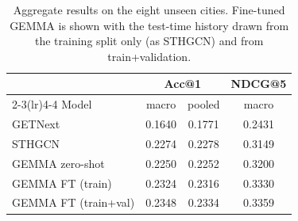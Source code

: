 \begin{table}[t]
\caption{Aggregate results on the eight unseen cities. Fine-tuned GEMMA is shown with the test-time
history drawn from the training split only (as STHGCN) and from train+validation.}
\label{tab:aggregate}
\small\setlength{\tabcolsep}{4pt}
\begin{tabular}{lccc}
\toprule
 & \multicolumn{2}{c}{Acc@1} & NDCG@5 \\
\cmidrule(lr){2-3}\cmidrule(lr){4-4}
Model & macro & pooled & macro \\
\midrule
GETNext & 0.1640 & 0.1771 & 0.2431 \\
STHGCN & 0.2274 & 0.2278 & 0.3149 \\
\midrule
GEMMA zero-shot & 0.2250 & 0.2252 & 0.3200 \\
GEMMA FT (train) & 0.2324 & 0.2316 & 0.3330 \\
GEMMA FT (train+val) & 0.2348 & 0.2334 & 0.3359 \\
\bottomrule
\end{tabular}
\end{table}
